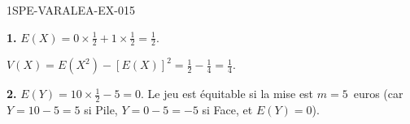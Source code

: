 \begin{corrige}{1SPE-VARALEA-EX-015}

\textbf{1.} $E(X) = 0 \times \frac{1}{2} + 1 \times \frac{1}{2} = \frac{1}{2}$.

$V(X) = E(X^2) - [E(X)]^2 = \frac{1}{2} - \frac{1}{4} = \frac{1}{4}$.

\medskip
\textbf{2.} $E(Y) = 10 \times \frac{1}{2} - 5 = 0$. Le jeu est équitable si la mise est $m = 5$~euros (car $Y = 10 - 5 = 5$ si Pile, $Y = 0 - 5 = -5$ si Face, et $E(Y) = 0$).

\end{corrige}
